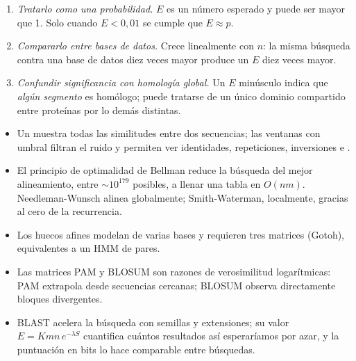 \begin{cuidado}
\begin{enumerate}
  \item \emph{Tratarlo como una probabilidad.} $E$ es un número esperado y puede ser mayor que 1. Solo cuando $E<0{,}01$ se cumple que $E\approx p$.
  \item \emph{Compararlo entre bases de datos.} Crece linealmente con $n$: la misma búsqueda contra una base de datos diez veces mayor produce un $E$ diez veces mayor.
  \item \emph{Confundir significancia con homología global.} Un $E$ minúsculo indica que \emph{algún segmento} es homólogo; puede tratarse de un único dominio compartido entre proteínas por lo demás distintas.
\end{enumerate}
\end{cuidado}

\begin{resumen}
\begin{itemize}
  \item Un  muestra todas las similitudes entre dos secuencias; las ventanas con umbral filtran el ruido y permiten ver identidades, repeticiones, inversiones e .
  \item El principio de optimalidad de Bellman reduce la búsqueda del mejor alineamiento, entre $\sim\!10^{179}$ posibles, a llenar una tabla en $O(nm)$. Needleman-Wunsch alinea globalmente; Smith-Waterman, localmente, gracias al cero de la recurrencia.
  \item Los huecos afines modelan  de varias bases y requieren tres matrices (Gotoh), equivalentes a un HMM de pares.
  \item Las matrices PAM y BLOSUM son razones de verosimilitud logarítmicas: PAM extrapola desde secuencias cercanas; BLOSUM observa directamente bloques divergentes.
  \item BLAST acelera la búsqueda con semillas y extensiones; su valor $E=Kmn\,e^{-\lambda S}$ cuantifica cuántos resultados así esperaríamos por azar, y la puntuación en bits lo hace comparable entre búsquedas.
\end{itemize}
\end{resumen}

